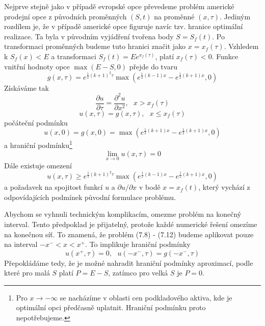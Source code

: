 \documentclass[a4paper]{book}
\begin{document}
Nejprve stejně jako v případě evropské opce převedeme problém americké prodejní opce z původních proměnných $(S,t)$ na proměnné $(x, \tau)$. Jediným rozdílem je, že v případě americké opce figuruje navíc tzv. hranice optimální realizace. Ta byla v původním vyjádření tvořena body $S = S_f(t)$. Po transformaci proměnných budeme tuto hranici značit jako $x = x_f(\tau)$. Vzhledem k $S_f(x) < E$ a transformaci $S_f(t) = E e^{x_f(\tau)}$, platí $x_f(\tau) < 0$. Funkce vnitřní hodnoty opce $\max(E - S, 0)$ přejde do tvaru
\begin{equation*}
g(x, \tau) = e^{\frac{1}{2}(k + 1)^2 \tau}\max(e^{\frac{1}{2}(k - 1)x} - e^{\frac{1}{2}(k + 1)x}, 0)
\end{equation*}
Získáváme tak
\begin{equation}
\frac{\partial u}{\partial \tau} = \frac{\partial^2 u}{\partial x^2},~~~x > x_f(\tau)
\end{equation}
\begin{equation}
u(x, \tau) = g(x, \tau),~~~x \le x_f(\tau)
\end{equation}
počáteční podmínku
\begin{equation}
u(x, 0) = g(x, 0) = \max(e^{\frac{1}{2}(k + 1)x} - e^{\frac{1}{2}(k + 1)x},0)
\end{equation}
a hraniční podmínku\footnote{Pro $x \rightarrow -\infty$ se nacházíme v oblasti cen podkladového aktiva, kde je optimální opci předčasně uplatnit. Hraniční podmínku proto nepotřebujeme.}
\begin{equation}
\underset{x \rightarrow 0}{\lim} u(x, \tau) = 0
\end{equation}
Dále existuje omezení
\begin{equation}
u(x, \tau) \ge e^{\frac{1}{2}(k + 1)^2 \tau} \max(e^{\frac{1}{2}(k - 1)x} - e^{\frac{1}{2}(k + 1)x}, 0)
\end{equation}
a požadavek na spojitost funkcí $u$ a $\partial u / \partial x$ v bodě $x = x_f(t)$, který vychází z odpovídajících podmínek původní formulace problému.

Abychom se vyhnuli technickým komplikacím, omezme problém na konečný interval. Tento předpoklad je přijatelný, protože každé numerické řešení omezíme na konečnou síť. To znamená, že problém (7.8) - (7.12) budeme aplikovat pouze na interval $-x^{-} < x < x^{+}$. To implikuje hraniční podmínky
\begin{equation*}
u(x^{+}, \tau) = 0,~~~u(-x^{-}, \tau) = g(-x^{-}, \tau)
\end{equation*}
Přepokládáme tedy, že je možné nahradit hraniční podmínky aproximací, podle které pro malá $S$ platí $P = E - S$, zatímco pro velká $S$ je $P = 0$.
\end{document}
